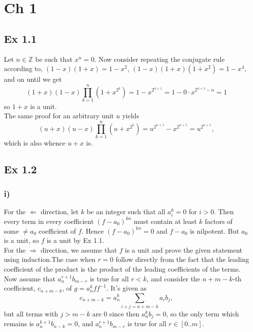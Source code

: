 \documentclass{article}
\theoremstyle{definition}
\newcommand{\Z}{\mathbb{Z}}
\begin{document}
\section*{Ch 1}
\subsection*{Ex 1.1}
Let $n \in \Z$ be such that $x^n = 0$. Now consider repeating the conjugate
rule according to, $(1 - x)(1 + x) = 1 - x^2$, $(1 - x)(1 + x)(1 + x^2) = 1 -
	x^4$, and on until we get $$ (1 + x)(1 - x)\prod_{k = 1}^{n}(1 + x^{2^{k}}) = 1
	- x^{2^{n + 1}} = 1 - 0 \cdot x^{2^{n + 1} - n} = 1 $$ so $1 + x$ is a unit. \\

The same proof for an arbitrary unit $u$ yields $$ (u + x)(u - x)\prod_{k =
		1}^{n}(u + x^{2^{k}}) = u^{2^{n+1}} - x^{2^{n + 1}} = u^{2^{n+1}}, $$ which is
also whence $u + x$ is.

\subsection*{Ex 1.2}
\subsubsection*{i)}

For the $\Leftarrow$ direction, let $k$ be an integer such that all $a_i^k = 0$
for $i > 0$. Then every term in every coefficient $(f - a_0)^{kn}$ must contain
at least $k$ factors of some $\not = a_0$ coefficient of $f$. Hence $(f -
	a_0)^{kn} = 0$ and $f - a_0$ is nilpotent. But $a_0$ is a unit, so $f$ is a
unit by Ex 1.1. \\

For the $\Rightarrow$ direction, we assume that $f$ is a unit and prove the
given statement using induction.The case when $r = 0$ follow directly from the
fact that the leading coefficient of the product is the product of the leading
coefficients of the terms. \\

Now assume that $a^{r + 1}_n b_{m - r}$ is true for all $r < k$, and consider
the $n + m - k$-th coefficient, $c_{n + m - k}$, of $g = a_{n}^k f f^{-1}$.
It's given as $$ c_{n + m - k} = a_{n}^k \sum_{i + j = n + m - k} a_i b_j, $$
but all terms with $j > m - k$ are $0$ since then $a_{n}^k b_j = 0$, so the
only term which remains is $a_{n}^{k + 1} b_{n - k} = 0$, and $a^{r + 1}_n b_{m
			- r}$ is true for all $r \in [0..m]$. \\
\end{document}
